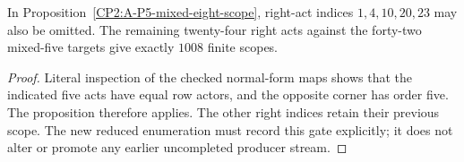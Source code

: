 \begin{corollary}
\label{CP2:A-P5-mixed-eight-row-scope}
In Proposition~\ref{CP2:A-P5-mixed-eight-scope}, right-act
indices $1,4,10,20,23$ may also be omitted. The remaining
twenty-four right acts against the forty-two mixed-five
targets give exactly $1008$ finite scopes.
\end{corollary}
\begin{proof}
Literal inspection of the checked normal-form maps shows
that the indicated five acts have equal row actors, and
the opposite corner has order five. The proposition
therefore applies. The other right indices retain their
previous scope. The new reduced enumeration must record
this gate explicitly; it does not alter or promote any
earlier uncompleted producer stream.
\end{proof}

